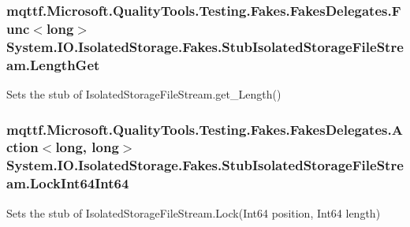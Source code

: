 \hypertarget{class_system_1_1_i_o_1_1_isolated_storage_1_1_fakes_1_1_stub_isolated_storage_file_stream_a4696a1051aec9b9c3f139f9098a0118d}{
\subsubsection[{Length\-Get}]{\setlength{\rightskip}{0pt plus 5cm}mqttf.\-Microsoft.\-Quality\-Tools.\-Testing.\-Fakes.\-Fakes\-Delegates.\-Func$<$long$>$ System.\-I\-O.\-Isolated\-Storage.\-Fakes.\-Stub\-Isolated\-Storage\-File\-Stream.\-Length\-Get}}\label{class_system_1_1_i_o_1_1_isolated_storage_1_1_fakes_1_1_stub_isolated_storage_file_stream_a4696a1051aec9b9c3f139f9098a0118d}


Sets the stub of Isolated\-Storage\-File\-Stream.\-get\-\_\-\-Length()

\hypertarget{class_system_1_1_i_o_1_1_isolated_storage_1_1_fakes_1_1_stub_isolated_storage_file_stream_a721cdf71e55cc7a133e50421712ff5fc}{
\subsubsection[{Lock\-Int64\-Int64}]{\setlength{\rightskip}{0pt plus 5cm}mqttf.\-Microsoft.\-Quality\-Tools.\-Testing.\-Fakes.\-Fakes\-Delegates.\-Action$<$long, long$>$ System.\-I\-O.\-Isolated\-Storage.\-Fakes.\-Stub\-Isolated\-Storage\-File\-Stream.\-Lock\-Int64\-Int64}}\label{class_system_1_1_i_o_1_1_isolated_storage_1_1_fakes_1_1_stub_isolated_storage_file_stream_a721cdf71e55cc7a133e50421712ff5fc}


Sets the stub of Isolated\-Storage\-File\-Stream.\-Lock(\-Int64 position, Int64 length)

